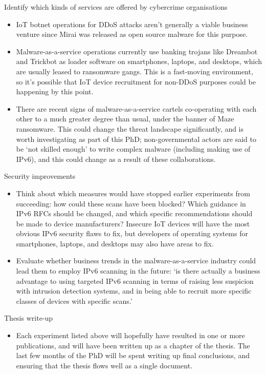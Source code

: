 \documentclass[10pt,sigconf]{acmart}
\begin{document}
Identify which kinds of services are offered by cybercrime organisations
\begin{itemize}
	\item IoT botnet operations for DDoS attacks aren't generally a viable business venture since Mirai was released as open source malware for this purpose.
	\item Malware-as-a-service operations currently use banking trojans like Dreambot and Trickbot as loader software on smartphones, laptops, and desktops, which are usually leased to ransomware gangs.
	This is a fast-moving environment, so it's possible that IoT device recruitment for non-DDoS purposes could be happening by this point.
	\item There are recent signs of malware-as-a-service cartels co-operating with each other to a much greater degree than usual, under the banner of Maze ransomware.
	This could change the threat landscape significantly, and is worth investigating as part of this PhD;
	non-governmental actors are said to be `not skilled enough' to write complex malware (including making use of IPv6), and this could change as a result of these collaborations.
\end{itemize}

Security improvements
\begin{itemize}
	\item Think about which measures would have stopped earlier experiments from succeeding:
	how could these scans have been blocked?
	Which guidance in IPv6 RFCs should be changed, and which specific recommendations should be made to device manufacturers?
	Insecure IoT devices will have the most obvious IPv6 security flaws to fix, but developers of operating systems for smartphones, laptops, and desktops may also have areas to fix.
	\item Evaluate whether business trends in the malware-as-a-service industry could lead them to employ IPv6 scanning in the future:
	`is there actually a business advantage to using targeted IPv6 scanning in terms of raising less suspicion with intrusion detection systems, and in being able to recruit more specific classes of devices with specific scans.'
\end{itemize}

Thesis write-up
\begin{itemize}
	\item Each experiment listed above will hopefully have resulted in one or more publications, and will have been written up as a chapter of the thesis.
	The last few months of the PhD will be spent writing up final conclusions, and ensuring that the thesis flows well as a single document.
\end{itemize}
\end{document}
